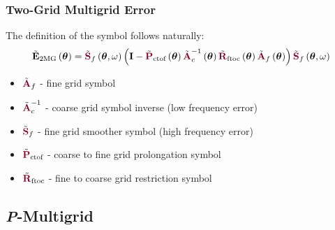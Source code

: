 \documentclass{beamer}
\begin{document}
\begin{frame}
\begin{center}
\frametitle{Two-Grid Multigrid Error}

The definition of the symbol follows naturally:\\

\begin{equation}
\tilde{\mathbf{E}}_{\text{2MG}} \left( \boldsymbol{\theta} \right) = \tilde{{\color{burgundy}\mathbf{S}}}_f \left( \boldsymbol{\theta}, \omega \right) \left( \mathbf{I} - \tilde{{\color{burgundy}\mathbf{P}}}_{\text{ctof}} \left( \boldsymbol{\theta} \right) \tilde{{\color{burgundy}\mathbf{A}}}_c^{-1} \left( \boldsymbol{\theta} \right) \tilde{{\color{burgundy}\mathbf{R}}}_{\text{ftoc}} \left( \boldsymbol{\theta} \right) \tilde{{\color{burgundy}\mathbf{A}}}_f \left( \boldsymbol{\theta} \right) \right) \tilde{{\color{burgundy}\mathbf{S}}}_f \left( \boldsymbol{\theta}, \omega \right)
\end{equation}

\begin{itemize}

\item $\tilde{{\color{burgundy}\mathbf{A}}}_f$ - fine grid symbol

\item $\tilde{{\color{burgundy}\mathbf{A}}}_c^{-1}$ - coarse grid symbol inverse (low frequency error)

\item $\tilde{{\color{burgundy}\mathbf{S}}}_f$ - fine grid smoother symbol (high frequency error)

\item $\tilde{{\color{burgundy}\mathbf{P}}}_{\text{ctof}}$ - coarse to fine grid prolongation symbol

\item $\tilde{{\color{burgundy}\mathbf{R}}}_{\text{ftoc}}$ - fine to coarse grid restriction symbol

\end{itemize}

\end{center}
\end{frame}


\subsection{{\textit P}-Multigrid}
\end{document}
